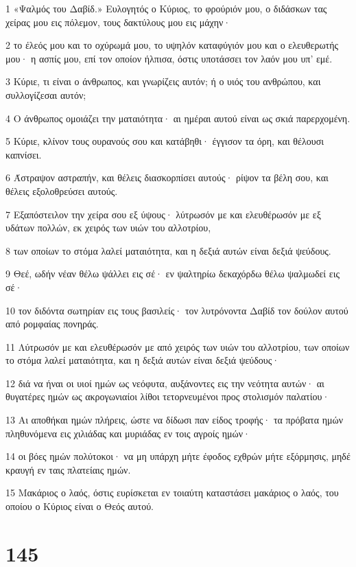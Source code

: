 \par 1 «Ψαλμός του Δαβίδ.» Ευλογητός ο Κύριος, το φρούριόν μου, ο διδάσκων τας χείρας μου εις πόλεμον, τους δακτύλους μου εις μάχην·
\par 2 το έλεός μου και το οχύρωμά μου, το υψηλόν καταφύγιόν μου και ο ελευθερωτής μου· η ασπίς μου, επί τον οποίον ήλπισα, όστις υποτάσσει τον λαόν μου υπ' εμέ.
\par 3 Κύριε, τι είναι ο άνθρωπος, και γνωρίζεις αυτόν; ή ο υιός του ανθρώπου, και συλλογίζεσαι αυτόν;
\par 4 Ο άνθρωπος ομοιάζει την ματαιότητα· αι ημέραι αυτού είναι ως σκιά παρερχομένη.
\par 5 Κύριε, κλίνον τους ουρανούς σου και κατάβηθι· έγγισον τα όρη, και θέλουσι καπνίσει.
\par 6 Άστραψον αστραπήν, και θέλεις διασκορπίσει αυτούς· ρίψον τα βέλη σου, και θέλεις εξολοθρεύσει αυτούς.
\par 7 Εξαπόστειλον την χείρα σου εξ ύψους· λύτρωσόν με και ελευθέρωσόν με εξ υδάτων πολλών, εκ χειρός των υιών του αλλοτρίου,
\par 8 των οποίων το στόμα λαλεί ματαιότητα, και η δεξιά αυτών είναι δεξιά ψεύδους.
\par 9 Θεέ, ωδήν νέαν θέλω ψάλλει εις σέ· εν ψαλτηρίω δεκαχόρδω θέλω ψαλμωδεί εις σέ·
\par 10 τον διδόντα σωτηρίαν εις τους βασιλείς· τον λυτρόνοντα Δαβίδ τον δούλον αυτού από ρομφαίας πονηράς.
\par 11 Λύτρωσόν με και ελευθέρωσόν με από χειρός των υιών του αλλοτρίου, των οποίων το στόμα λαλεί ματαιότητα, και η δεξιά αυτών είναι δεξιά ψεύδους·
\par 12 διά να ήναι οι υιοί ημών ως νεόφυτα, αυξάνοντες εις την νεότητα αυτών· αι θυγατέρες ημών ως ακρογωνιαίοι λίθοι τετορνευμένοι προς στολισμόν παλατίου·
\par 13 Αι αποθήκαι ημών πλήρεις, ώστε να δίδωσι παν είδος τροφής· τα πρόβατα ημών πληθυνόμενα εις χιλιάδας και μυριάδας εν τοις αγροίς ημών·
\par 14 οι βόες ημών πολύτοκοι· να μη υπάρχη μήτε έφοδος εχθρών μήτε εξόρμησις, μηδέ κραυγή εν ταις πλατείαις ημών.
\par 15 Μακάριος ο λαός, όστις ευρίσκεται εν τοιαύτη καταστάσει μακάριος ο λαός, του οποίου ο Κύριος είναι ο Θεός αυτού.

\chapter{145}

